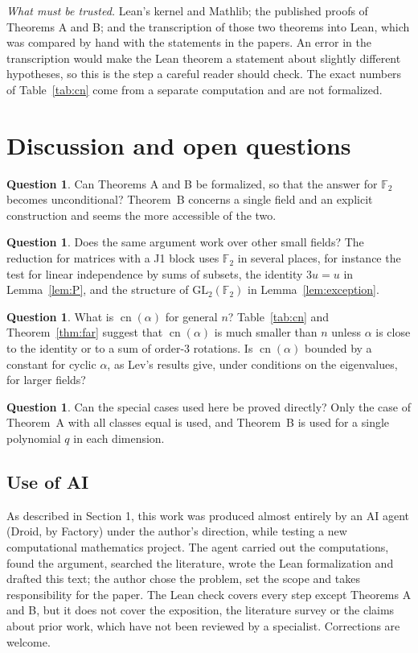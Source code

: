 \documentclass[11pt]{amsart}
\theoremstyle{definition}
\newtheorem{question}[theorem]{Question}
\theoremstyle{remark}
\newcommand{\F}{\mathbb{F}_2}
\newcommand{\GL}{\mathrm{GL}}
\newcommand{\cn}{\operatorname{cn}}
\begin{document}
\emph{What must be trusted.} Lean's kernel and Mathlib; the published proofs of Theorems A and
B; and the transcription of those two theorems into Lean, which was compared by hand with the
statements in the papers. An error in the transcription would make the Lean theorem a statement
about slightly different hypotheses, so this is the step a careful reader should check. The
exact numbers of Table~\ref{tab:cn} come from a separate computation and are not formalized.

\section{Discussion and open questions}\label{sec:discussion}

\begin{question}
Can Theorems A and B be formalized, so that the answer for $\F$ becomes unconditional? Theorem~B
concerns a single field and an explicit construction and seems the more accessible of the two.
\end{question}

\begin{question}
Does the same argument work over other small fields? The reduction for matrices with a J1 block
uses $\F$ in several places, for instance the test for linear independence by sums of subsets,
the identity $3u=u$ in Lemma~\ref{lem:P}, and the structure of $\GL_2(\F)$ in
Lemma~\ref{lem:exception}.
\end{question}

\begin{question}
What is $\cn(\alpha)$ for general $n$? Table~\ref{tab:cn} and Theorem~\ref{thm:far} suggest that
$\cn(\alpha)$ is much smaller than $n$ unless $\alpha$ is close to the identity or to a sum of
order-$3$ rotations. Is $\cn(\alpha)$ bounded by a constant for cyclic $\alpha$, as Lev's results
give, under conditions on the eigenvalues, for larger fields?
\end{question}

\begin{question}
Can the special cases used here be proved directly? Only the case of Theorem~A with all classes
equal is used, and Theorem~B is used for a single polynomial $q$ in each dimension.
\end{question}

\subsection*{Use of AI}
As described in Section 1, this work was produced almost entirely by an AI agent (Droid, by
Factory) under the author's direction, while testing a new computational mathematics project. The
agent carried out the computations, found the argument, searched the literature, wrote the Lean
formalization and drafted this text; the author chose the problem, set the scope and takes
responsibility for the paper. The Lean check covers every step except Theorems A and B, but it
does not cover the exposition, the literature survey or the claims about prior work, which have
not been reviewed by a specialist. Corrections are welcome.
\end{document}

